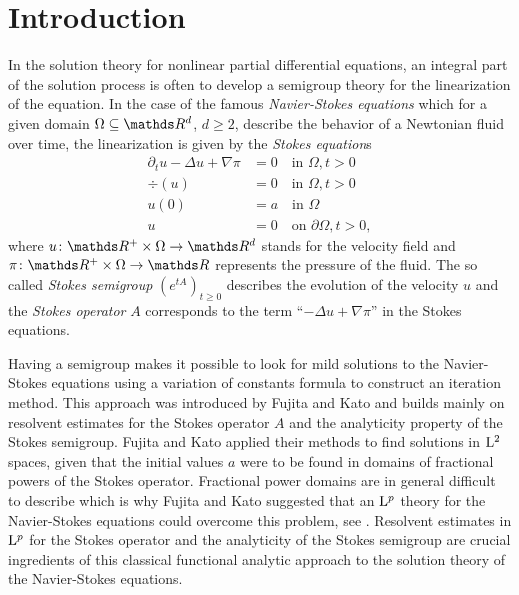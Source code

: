 \chapter*{Introduction}

In the solution theory for nonlinear partial differential equations, an integral part of the solution process is often to develop a semigroup theory for the linearization of the equation.
In the case of the famous \emph{Navier-Stokes equations} which for a given domain $\Omega \subseteq \R^d$, $d \geq 2$, describe the behavior of a Newtonian fluid over time, the linearization is given by the \emph{Stokes equation}s
\begin{align*}
  \partial_t u - \Delta u + \nabla \pi &= 0 \quad\text{in } \Omega, t > 0\\
  \div(u) &= 0 \quad\text{in } \Omega, t > 0 \\
  u(0) &= a \quad\text{in } \Omega \\
  u &= 0 \quad\text{on } \partial\Omega, t > 0,
\end{align*}
where $u \colon \R^+ \times \Omega \to \R^d$ stands for the velocity field and $\pi \colon \R^+ \times \Omega \to \R$ represents the pressure of the fluid.
The so called \emph{Stokes semigroup} $(e^{tA})_{t \geq 0}$ describes the evolution of the velocity $u$ and the \emph{Stokes operator} $A$ corresponds to the term ``$-\Delta u + \nabla \pi$'' in the Stokes equations. 

Having a semigroup makes it possible to look for mild solutions to the Navier-Stokes equations using a variation of constants formula to construct an iteration method.
This approach was introduced by Fujita and Kato \cite{fujitaKato,katoFujita} and builds mainly on resolvent estimates for the Stokes operator $A$ and the analyticity property of the Stokes semigroup.
Fujita and Kato applied their methods to find solutions in $\mathrm{L}^2$ spaces, given that the initial values $a$ were to be found in domains of fractional powers of the Stokes operator.
Fractional power domains are in general difficult to describe which is why Fujita and Kato suggested that an $\mathrm{L}^p$ theory for the Navier-Stokes equations could overcome this problem, see \cite[p.\@~313]{fujitaKato}.
Resolvent estimates in $\mathrm{L}^p$ for the Stokes operator and the analyticity of the Stokes semigroup are crucial ingredients of this classical functional analytic approach to the solution theory of the Navier-Stokes equations.

